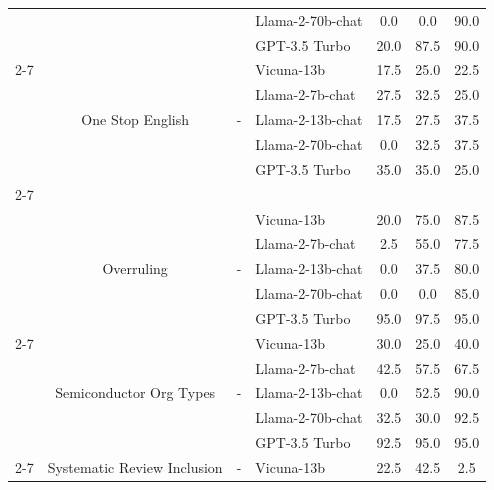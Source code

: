 \begin{longtable} {@{}ccclccc@{}}
&                         &                         &Llama-2-70b-chat & 0.0 & 0.0 & 90.0\\
&                         &                         &GPT-3.5 Turbo & 20.0 & 87.5 & 90.0\\ \cmidrule(l){2-7}
                         & \multirow{5}{*}{One Stop English}      & \multirow{5}{*}{-}  & Vicuna-13b & 17.5 & 25.0 & 22.5\\
&                         &                         &Llama-2-7b-chat & 27.5 & 32.5 & 25.0\\
&                         &                         &Llama-2-13b-chat & 17.5 & 27.5 & 37.5\\
&                         &                         &Llama-2-70b-chat & 0.0 & 32.5 & 37.5\\
&                         &                         &GPT-3.5 Turbo & 35.0 & 35.0 & 25.0\\ \cmidrule(l){2-7}
\multirow{10}{*}{\begin{tabular}[c]{@{}c@{}}RAFT\\ \citep{alex2022raft}\end{tabular}}  & \multirow{5}{*}{Overruling}      & \multirow{5}{*}{-}  & Vicuna-13b & 20.0 & 75.0 & 87.5\\
&                         &                         &Llama-2-7b-chat & 2.5 & 55.0 & 77.5\\
&                         &                         &Llama-2-13b-chat & 0.0 & 37.5 & 80.0\\
&                         &                         &Llama-2-70b-chat & 0.0 & 0.0 & 85.0\\
&                         &                         &GPT-3.5 Turbo & 95.0 & 97.5 & 95.0\\ \cmidrule(l){2-7}
                         & \multirow{5}{*}{Semiconductor Org Types}     & \multirow{5}{*}{-}   & Vicuna-13b & 30.0 & 25.0 & 40.0\\
&                         &                         &Llama-2-7b-chat & 42.5 & 57.5 & 67.5\\
&                         &                         &Llama-2-13b-chat & 0.0 & 52.5 & 90.0\\
&                         &                         &Llama-2-70b-chat & 32.5 & 30.0 & 92.5\\
&                         &                         &GPT-3.5 Turbo & 92.5 & 95.0 & 95.0\\ \cmidrule(l){2-7}
                         & \multirow{5}{*}{Systematic Review Inclusion}     & \multirow{5}{*}{-}   & Vicuna-13b & 22.5 & 42.5 & 2.5\\

\end{longtable}
